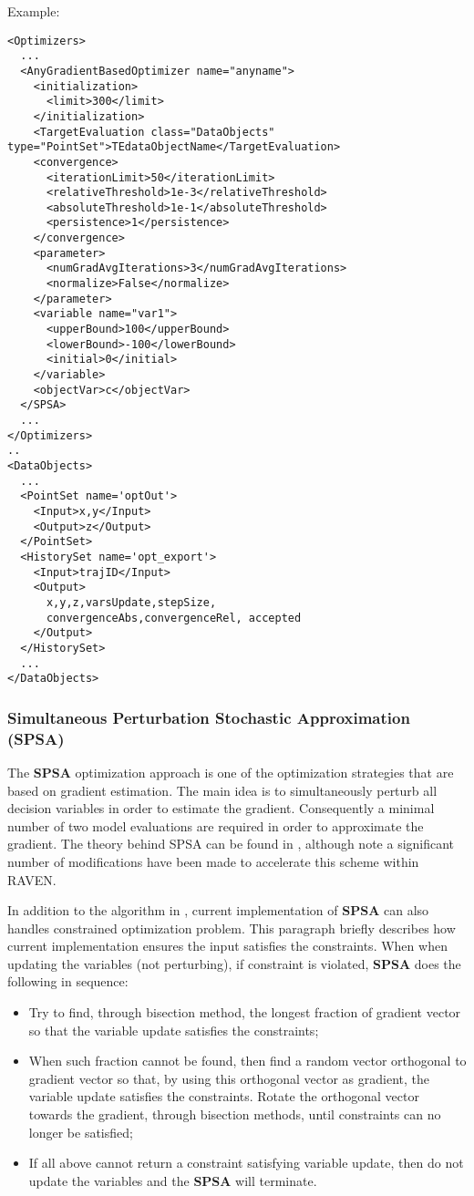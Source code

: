 Example:
\begin{lstlisting}[style=XML]
<Optimizers>
  ...
  <AnyGradientBasedOptimizer name="anyname">
    <initialization>
      <limit>300</limit>
    </initialization>
    <TargetEvaluation class="DataObjects" type="PointSet">TEdataObjectName</TargetEvaluation>
    <convergence>
      <iterationLimit>50</iterationLimit>
      <relativeThreshold>1e-3</relativeThreshold>
      <absoluteThreshold>1e-1</absoluteThreshold>
      <persistence>1</persistence>
    </convergence>
    <parameter>
      <numGradAvgIterations>3</numGradAvgIterations>
      <normalize>False</normalize>
    </parameter>
    <variable name="var1">
      <upperBound>100</upperBound>
      <lowerBound>-100</lowerBound>
      <initial>0</initial>
    </variable>
    <objectVar>c</objectVar>
  </SPSA>
  ...
</Optimizers>
..
<DataObjects>
  ...
  <PointSet name='optOut'>
    <Input>x,y</Input>
    <Output>z</Output>
  </PointSet>
  <HistorySet name='opt_export'>
    <Input>trajID</Input>
    <Output>
      x,y,z,varsUpdate,stepSize,
      convergenceAbs,convergenceRel, accepted
    </Output>
  </HistorySet>
  ...
</DataObjects>
\end{lstlisting}

\subsubsection{Simultaneous Perturbation Stochastic Approximation (SPSA)}
\label{subsubsubsec:SPSA}
The \textbf{SPSA} optimization approach is one of the optimization strategies that are based on gradient estimation. The main
idea is to simultaneously perturb all decision variables in order to estimate the gradient. Consequently a minimal number of two
model evaluations are required in order to approximate the gradient. The theory behind SPSA can be found in
\cite{spall1998implementation}, although note a significant number of modifications have been made to
accelerate this scheme within RAVEN.

In addition to the algorithm in \cite{spall1998implementation}, current implementation of \textbf{SPSA} can also handles
constrained optimization problem. This paragraph briefly describes how current implementation ensures the input satisfies the
constraints. When when updating the variables (not perturbing), if constraint is violated, \textbf{SPSA} does the following in
sequence:
\begin{itemize}
\item Try to find, through bisection method, the longest fraction of gradient vector so that the variable update satisfies the
constraints;
\item When such fraction cannot be found, then find a random vector orthogonal to gradient vector so that, by using this
orthogonal vector as gradient, the variable update satisfies the constraints. Rotate the orthogonal vector towards the gradient,
through bisection methods, until constraints can no longer be satisfied;
\item If all above cannot return a constraint satisfying variable update, then do not update the variables and the \textbf{SPSA} will
terminate.
\end{itemize}

